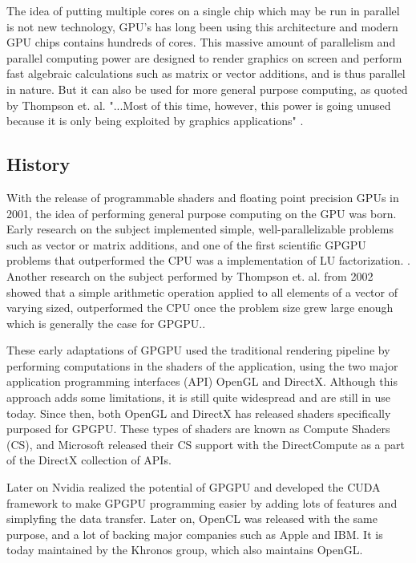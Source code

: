 The idea of putting multiple cores on a single chip which may be run in parallel is not new technology, GPU's has long been using this architecture and modern GPU chips contains hundreds of cores. This massive amount of parallelism and parallel computing power are designed to render graphics on screen and perform fast algebraic calculations such as matrix or vector additions, and is thus parallel in nature. But it can also be used for more general purpose computing, as quoted by Thompson et. al. "...Most of this time, however, this power is going unused because it is only
being exploited by graphics applications" \cite{thompson2002gpgpu}.


\subsection{History}
With the release of programmable shaders and floating point precision GPUs in 2001, the idea of performing general purpose computing on the GPU was born. Early research on the subject implemented simple, well-parallelizable problems such as vector or matrix additions, and one of the first scientific GPGPU problems that outperformed the CPU was a implementation of LU factorization. \cite{CUDAtoOpenCL}. Another research on the subject performed by Thompson et. al. from 2002 showed that a simple arithmetic operation applied to all elements of a vector of varying sized, outperformed the CPU once the problem size grew large enough which is generally the case for GPGPU.\cite{thompson2002gpgpu}.

These early adaptations of GPGPU used the traditional rendering pipeline by performing computations in the shaders of the application, using the two major application programming interfaces (API) OpenGL and DirectX. Although this approach adds some limitations, it is still quite widespread and are still in use today. Since then, both OpenGL and DirectX has released shaders specifically purposed for GPGPU. These types of shaders are known as Compute Shaders (CS), and Microsoft released their CS support with the DirectCompute as a part of the DirectX collection of APIs.

Later on Nvidia realized the potential of GPGPU and developed the CUDA framework to make GPGPU programming easier by adding lots of features and simplyfing the data transfer. Later on, OpenCL was released with the same purpose, and a lot of backing major companies such as Apple and IBM. It is today maintained by the Khronos group, which also maintains OpenGL.



